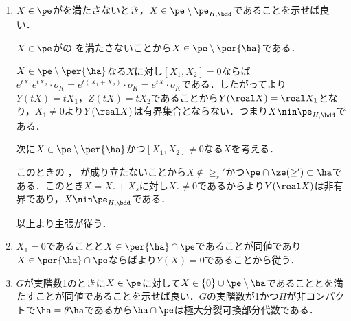 \begin{npfwn}
  \leavevmode\vspace{-1em}
  \begin{enumerate}[label=\textbf{\arabic*.}]
    
  \item $X\in \pe$がを満たさないとき，$X\in \pe\setminus\pe_{H,\bdd} $であることを示せば良い．
    
    $X\in \pe$がの  を満たさないことから$X\in\pe\setminus\per{\ha} $である．

    $X\in \pe\setminus\per{\ha} $なる$X$に対し$[X_1,X_2] = 0$ならば$e^{tX_1}e^{tX_2}\cdot o_K = e^{t(X_1 + X_2)}\cdot o_K = e^{tX}\cdot o_K$である．したがってより$Y(tX) = tX_1 $，$Z(tX) = tX_2 $であることから$Y(\real X) = \real X_1 $となり，$X_1\neq 0$より$Y(\real X)$は有界集合とならない．つまり$X\nin\pe_{H,\bdd} $である．

    次に$X\in \pe\setminus \per{\ha} $かつ$[X_1,X_2] \neq 0$なる$X$を考える．

    このときの ， が成り立たないことから$X\nin \ge_{s}' $かつ$\pe\cap \ze(\ge')\subset \ha $である．このとき$X = X_c + X_s $に対し$X_c\neq 0$であるからより$Y(\real X)$は非有界であり，$X\nin\pe_{H,\bdd} $である．


    以上より主張が従う．
  \item $X_1 = 0$であることと$ X\in \per{\ha}\cap\pe $であることが同値であり$X\in \per{\ha}\cap\pe $ならばより$Y(X) = 0 $であることから従う．
  \item $G$が実階数1のときに$X\in \pe$に対して$X\in \{0\}\cup \pe\setminus \ha $であることとを満たすことが同値であることを示せば良い．$G$の実階数が1かつ$H$が非コンパクトで$\ha = \theta\ha$であるから$\ha\cap\pe$は極大分裂可換部分代数である．


\end{enumerate}
\end{npfwn}
